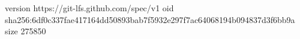 version https://git-lfs.github.com/spec/v1
oid sha256:6df0c337fae417164dd50893bab7f5932e297f7ac64068194b094837d3f6bb9a
size 275850
